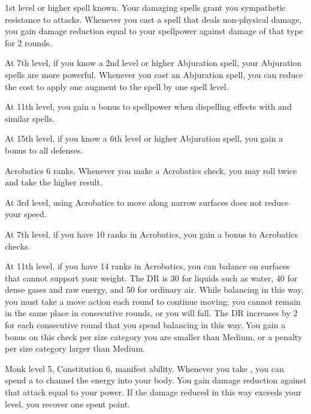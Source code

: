     \featpre 1st level or higher  spell known.
    \featben Your damaging spells grant you sympathetic resistance to attacks.
    Whenever you cast a spell that deals non-physical damage, you gain damage reduction equal to your spellpower against damage of that type for 2 rounds.

    At 7th level, if you know a 2nd level or higher Abjuration spell, your Abjuration spells are more powerful.
    Whenever you cast an Abjuration spell, you can reduce the cost to apply one augment to the spell by one spell level.

    At 11th level, you gain a  bonus to spellpower when dispelling effects with  and similar spells.

    At 15th level, if you know a 6th level or higher Abjuration spell, you gain a  bonus to all defenses.

    \featpre Acrobatics 6 ranks.
    \featben Whenever you make a Acrobatics check, you may roll twice and take the higher result.

    At 3rd level, using Acrobatics to move along narrow surfaces does not reduce your speed.

    At 7th level, if you have 10 ranks in Acrobatics, you gain a  bonus to Acrobatics checks.

    At 11th level, if you have 14 ranks in Acrobatics, you can balance on surfaces that cannot support your weight.
    The DR is 30 for liquids such as water, 40 for dense gases and raw energy, and 50 for ordinary air.
    While balancing in this way, you must take a move action each round to continue moving; you cannot remain in the same place in consecutive rounds, or you will fall.
    The DR increases by 2 for each consecutive round that you spend balancing in this way.
    You gain a  bonus on this check per size category you are smaller than Medium, or a  penalty per size category larger than Medium.
    \magical

    \featpres Monk level 5, Constitution 6, manifest \ki ability.
    \featben Whenever you take , you can spend a  to channel the energy into your body.
    You gain damage reduction against that attack equal to your \ki power.
    If the damage reduced in this way exceeds your level, you recover one spent \ki point.

